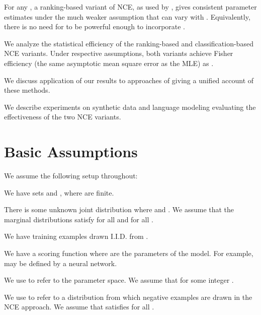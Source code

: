 \documentclass[11pt,a4paper]{article}
\begin{document}
 For any , a ranking-based variant of NCE, as used by
  \cite{jozefowicz2016exploring}, gives consistent parameter estimates under the much
  weaker assumption that  can vary with
  . Equivalently, there is no need for  to be
  powerful enough to incorporate .

 We analyze the statistical efficiency of the ranking-based and
  classification-based NCE variants. Under respective assumptions,
  both variants achieve Fisher efficiency (the same asymptotic
  mean square error as the MLE) as .

 We discuss application of our results to approaches of
\cite{mnih2012fast,Mikolov:2013,Levy:2014:NWE,jozefowicz2016exploring}
giving a unified account of these 
methods.

 We describe experiments on synthetic data and language modeling evaluating the
effectiveness of the two NCE variants.



\vspace{-1.5ex}
\section{Basic Assumptions}

We assume the following setup throughout:


 We have sets  and , where  are
  finite. 

 There is some unknown joint distribution  where
   and . We assume that the marginal distributions satisfy  for all  and
   for all . 

 We have training examples 
drawn I.I.D. from .

  We have a scoring function  where 
   are the parameters of the model. For example,  may
   be defined by a neural network. 


 We use  to refer to the parameter space.
We assume that  for some integer .

 We use  to refer to a distribution from which
negative examples are drawn in the NCE approach. We assume that
 satisfies  for all .
\end{document}
